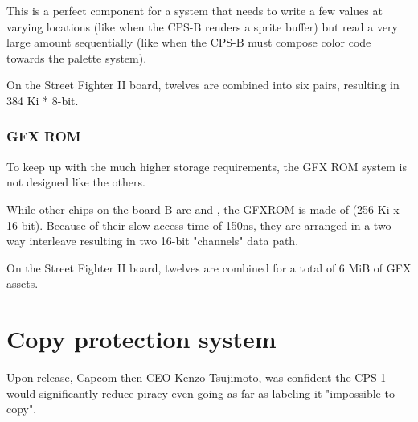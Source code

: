  This is a perfect component for a system that needs to write a few values at varying locations (like when the CPS-B renders a sprite buffer) but read a very large amount sequentially (like when the CPS-B must compose color code towards the palette system).

 On the Street Fighter II board, twelves  are combined into six pairs, resulting in 384 Ki * 8-bit.







\subsubsection{GFX ROM}
To keep up with the much higher storage requirements, the GFX ROM system is not designed like the others. 

While other chips on the board-B are  and , the GFXROM is made of  (256 Ki x 16-bit). Because of their slow access time of 150ns, they are arranged in a two-way interleave resulting in two 16-bit "channels" data path.



On the Street Fighter II board, twelves  are combined for a total of 6 MiB of GFX assets.


\section{Copy protection system}

Upon release, Capcom then CEO Kenzo Tsujimoto, was confident the CPS-1 would significantly reduce piracy even going as far as labeling it "impossible to copy".

